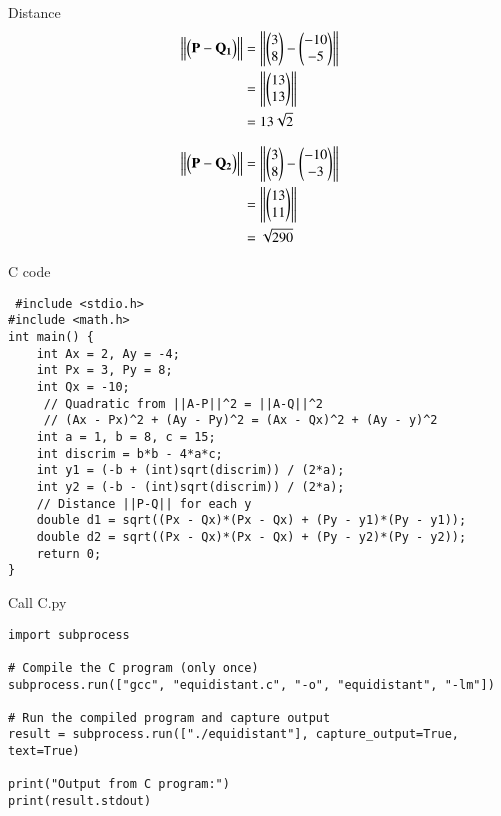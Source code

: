 \documentclass{beamer}
\begin{document}
\begin{frame}{Distance}
\begin{align}
    \left\lVert\begin{pmatrix}\mathbf{P} - \mathbf{Q_1}\end{pmatrix}\right\rVert &= \left\|\begin{pmatrix}3\\8\end{pmatrix} - \begin{pmatrix}-10\\-5\end{pmatrix}\right\| \\
    &= \left\|\begin{pmatrix}13\\13\end{pmatrix}\right\| \\
    &= 13\sqrt{2}
\end{align}

\begin{align}
    \left\lVert\begin{pmatrix}\mathbf{P} - \mathbf{Q_2}\end{pmatrix}\right\rVert &= \left\|\begin{pmatrix}3\\8\end{pmatrix} - \begin{pmatrix}-10\\-3\end{pmatrix}\right\| \\
    &= \left\|\begin{pmatrix}13\\11\end{pmatrix}\right\| \\
    &= \sqrt{290}
\end{align}

\end{frame}

\begin{frame}[fragile]{C code}
\begin{lstlisting}
 #include <stdio.h>
#include <math.h>
int main() {
    int Ax = 2, Ay = -4;
    int Px = 3, Py = 8;
    int Qx = -10;
     // Quadratic from ||A-P||^2 = ||A-Q||^2
     // (Ax - Px)^2 + (Ay - Py)^2 = (Ax - Qx)^2 + (Ay - y)^2
    int a = 1, b = 8, c = 15;
    int discrim = b*b - 4*a*c;
    int y1 = (-b + (int)sqrt(discrim)) / (2*a);
    int y2 = (-b - (int)sqrt(discrim)) / (2*a);
    // Distance ||P-Q|| for each y
    double d1 = sqrt((Px - Qx)*(Px - Qx) + (Py - y1)*(Py - y1));
    double d2 = sqrt((Px - Qx)*(Px - Qx) + (Py - y2)*(Py - y2));
    return 0;
}
\end{lstlisting}    
\end{frame}

\begin{frame}[fragile]{Call C.py}
\begin{lstlisting}
import subprocess

# Compile the C program (only once)
subprocess.run(["gcc", "equidistant.c", "-o", "equidistant", "-lm"])

# Run the compiled program and capture output
result = subprocess.run(["./equidistant"], capture_output=True, text=True)

print("Output from C program:")
print(result.stdout)
\end{lstlisting}
\end{frame}
\end{document}
